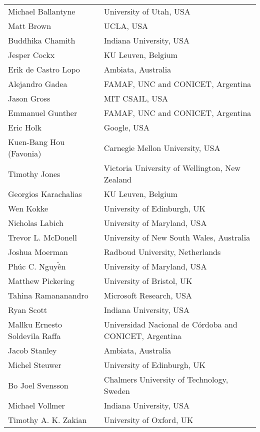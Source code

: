 \begin{tabular}{@{}p{\namewidth}l@{}}
Michael Ballantyne &   University of Utah, USA \\
Matt Brown                       & UCLA, USA\\
Buddhika Chamith                 & Indiana University, USA\\
Jesper Cockx &         KU Leuven, Belgium \\
Erik de Castro Lopo              & Ambiata, Australia\\
Alejandro Gadea                  & FAMAF, UNC and CONICET, Argentina\\
Jason Gross                      & MIT CSAIL, USA\\
Emmanuel Gunther                 & FAMAF, UNC and CONICET, Argentina\\
Eric Holk                        & Google, USA\\
Kuen-Bang Hou (Favonia)          & Carnegie Mellon University, USA\\
Timothy Jones                    & Victoria University of Wellington, New Zealand\\
Georgios Karachalias             & KU Leuven, Belgium\\
Wen Kokke                        & University of Edinburgh, UK\\
Nicholas Labich                  & University of Maryland, USA\\
Trevor L. McDonell               & University of New South Wales, Australia\\
Joshua Moerman                   & Radboud University, Netherlands\\
Phúc C. Nguy$\tilde{\mbox{ê}}$n  & University of Maryland, USA\\
Matthew Pickering                & University of Bristol, UK\\
Tahina Ramananandro              & Microsoft Research, USA\\
Ryan Scott                       & Indiana University, USA\\
Mallku Ernesto Soldevila Raffa   & Universidad Nacional de Córdoba and CONICET, Argentina\\
Jacob Stanley                    & Ambiata, Australia\\
Michel Steuwer                   & University of Edinburgh, UK\\
Bo Joel Svensson                 & Chalmers University of Technology, Sweden\\
Michael Vollmer                  & Indiana University, USA\\
Timothy A. K. Zakian             & University of Oxford, UK\\
\end{tabular}

